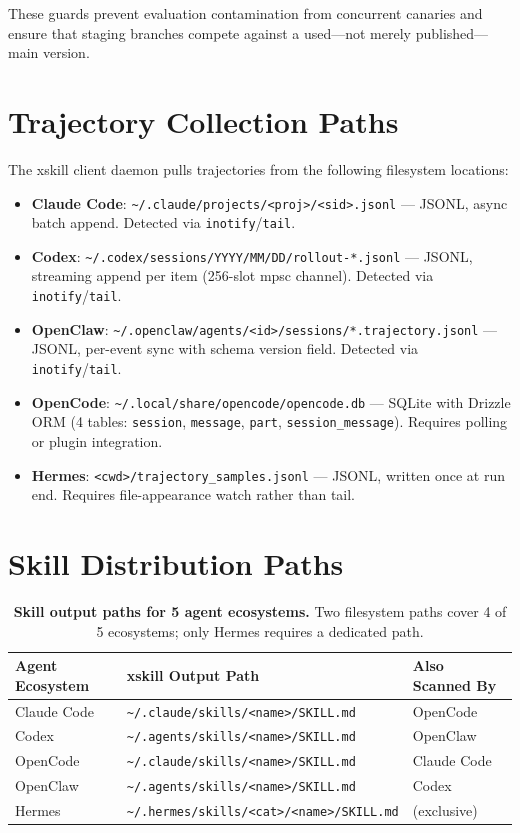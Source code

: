 \documentclass{article}
\begin{document}
These guards prevent evaluation contamination from concurrent canaries and ensure that staging branches compete against a used---not merely published---main version.

\section{Trajectory Collection Paths}
\label{app:paths}

The xskill client daemon pulls trajectories from the following filesystem locations:

\begin{itemize}
    \item \textbf{Claude Code}: \texttt{\~{}/.claude/projects/<proj>/<sid>.jsonl} --- JSONL, async batch append. Detected via \texttt{inotify}/\texttt{tail}.
    \item \textbf{Codex}: \texttt{\~{}/.codex/sessions/YYYY/MM/DD/rollout-*.jsonl} --- JSONL, streaming append per item (256-slot mpsc channel). Detected via \texttt{inotify}/\texttt{tail}.
    \item \textbf{OpenClaw}: \texttt{\~{}/.openclaw/agents/<id>/sessions/*.trajectory.jsonl} --- JSONL, per-event sync with schema version field. Detected via \texttt{inotify}/\texttt{tail}.
    \item \textbf{OpenCode}: \texttt{\~{}/.local/share/opencode/opencode.db} --- SQLite with Drizzle ORM (4 tables: \texttt{session}, \texttt{message}, \texttt{part}, \texttt{session\_message}). Requires polling or plugin integration.
    \item \textbf{Hermes}: \texttt{<cwd>/trajectory\_samples.jsonl} --- JSONL, written once at run end. Requires file-appearance watch rather than tail.
\end{itemize}

\section{Skill Distribution Paths}
\label{app:distribution}

\begin{table}[h]
\centering
\caption{\textbf{Skill output paths for 5 agent ecosystems.} Two filesystem paths cover 4 of 5 ecosystems; only Hermes requires a dedicated path.}
\label{tab:distribution}
\small
\begin{tabular}{@{}lll@{}}
\toprule
\textbf{Agent Ecosystem} & \textbf{xskill Output Path} & \textbf{Also Scanned By} \\
\midrule
Claude Code & \texttt{\~{}/.claude/skills/<name>/SKILL.md} & OpenCode \\
Codex       & \texttt{\~{}/.agents/skills/<name>/SKILL.md} & OpenClaw \\
OpenCode    & \texttt{\~{}/.claude/skills/<name>/SKILL.md} & Claude Code \\
OpenClaw    & \texttt{\~{}/.agents/skills/<name>/SKILL.md} & Codex \\
Hermes      & \texttt{\~{}/.hermes/skills/<cat>/<name>/SKILL.md} & (exclusive) \\
\bottomrule
\end{tabular}
\end{table}
\end{document}
